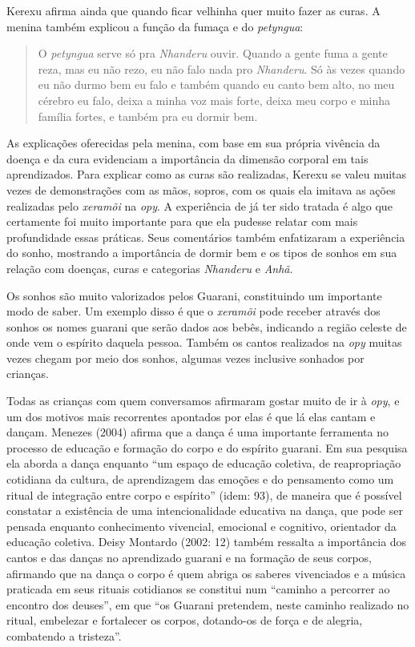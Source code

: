 Kerexu afirma ainda que quando ficar velhinha quer muito fazer as curas.
A menina também explicou a função da fumaça e do \emph{petyngua}:

\begin{quotation}
O \emph{petyngua} serve só pra \emph{Nhanderu} ouvir. Quando a gente fuma a gente
reza, mas eu não rezo, eu não falo nada pro \emph{Nhanderu}. Só às vezes
quando eu não durmo bem eu falo e também quando eu canto bem alto, no
meu cérebro eu falo, deixa a minha voz mais forte, deixa meu corpo e
minha família fortes, e também pra eu dormir bem.
\end{quotation}

As explicações oferecidas pela menina, com base em sua própria vivência
da doença e da cura evidenciam a importância da dimensão corporal em
tais aprendizados. Para explicar como as curas são realizadas, Kerexu
se valeu muitas vezes de demonstrações com as mãos, sopros, com os
quais ela imitava as ações realizadas pelo \emph{xeramõi} na \emph{opy}. A
experiência de já ter sido tratada é algo que certamente foi muito
importante para que ela pudesse relatar com mais profundidade essas
práticas. Seus comentários também enfatizaram a experiência do sonho,
mostrando a importância de dormir bem e os tipos de sonhos em sua
relação com doenças, curas e categorias \emph{Nhanderu} e \emph{Anhã}.

Os sonhos são muito valorizados pelos Guarani, constituindo um
importante modo de saber. Um exemplo disso é que o \emph{xeramõi} pode receber
através dos sonhos os nomes guarani que serão dados aos bebês,
indicando a região celeste de onde vem o espírito daquela pessoa.
Também os cantos realizados na \emph{opy} muitas vezes chegam por meio dos
sonhos, algumas vezes inclusive sonhados por crianças.

Todas as crianças com quem conversamos afirmaram gostar muito de ir à
\emph{opy}, e um dos motivos mais recorrentes apontados por elas é que lá elas
cantam e dançam. Menezes (2004) afirma que a dança é uma importante
ferramenta no processo de educação e formação do corpo e do espírito
guarani. Em sua pesquisa ela aborda a dança enquanto ``um espaço de
educação coletiva, de reapropriação cotidiana da cultura, de
aprendizagem das emoções e do pensamento como um ritual de integração
entre corpo e espírito'' (idem: 93), de maneira que é possível constatar
a existência de uma intencionalidade educativa na dança, que pode ser
pensada enquanto conhecimento vivencial, emocional e cognitivo,
orientador da educação coletiva. Deisy Montardo (2002: 12) também
ressalta a importância dos cantos e das danças no aprendizado guarani e
na formação de seus corpos, afirmando que na dança o corpo é quem
abriga os saberes vivenciados e a música praticada em seus rituais
cotidianos se constitui num ``caminho a percorrer ao encontro dos
deuses'', em que ``os Guarani pretendem, neste caminho realizado no
ritual, embelezar e fortalecer os corpos, dotando-os de força e de
alegria, combatendo a tristeza''.

